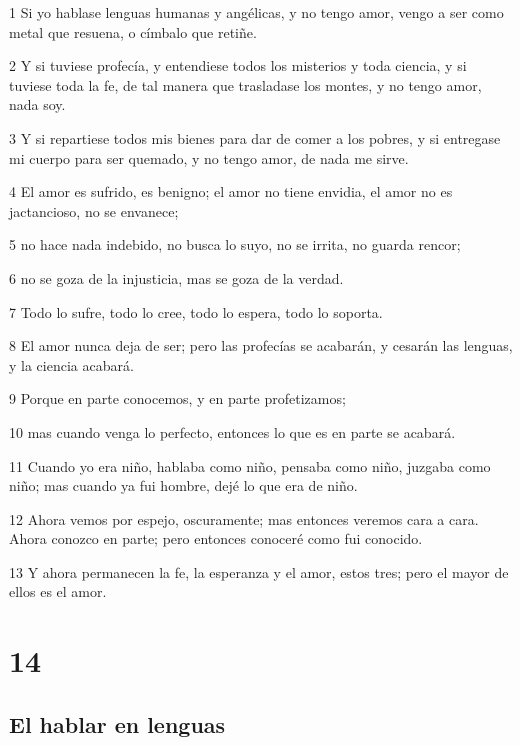 \par 1 Si yo hablase lenguas humanas y angélicas, y no tengo amor, vengo a ser como metal que resuena, o címbalo que retiñe.
\par 2 Y si tuviese profecía, y entendiese todos los misterios y toda ciencia, y si tuviese toda la fe, de tal manera que trasladase los montes, y no tengo amor, nada soy.
\par 3 Y si repartiese todos mis bienes para dar de comer a los pobres, y si entregase mi cuerpo para ser quemado, y no tengo amor, de nada me sirve.
\par 4 El amor es sufrido, es benigno; el amor no tiene envidia, el amor no es jactancioso, no se envanece;
\par 5 no hace nada indebido, no busca lo suyo, no se irrita, no guarda rencor;
\par 6 no se goza de la injusticia, mas se goza de la verdad.
\par 7 Todo lo sufre, todo lo cree, todo lo espera, todo lo soporta.
\par 8 El amor nunca deja de ser; pero las profecías se acabarán, y cesarán las lenguas, y la ciencia acabará.
\par 9 Porque en parte conocemos, y en parte profetizamos;
\par 10 mas cuando venga lo perfecto, entonces lo que es en parte se acabará.
\par 11 Cuando yo era niño, hablaba como niño, pensaba como niño, juzgaba como niño; mas cuando ya fui hombre, dejé lo que era de niño.
\par 12 Ahora vemos por espejo, oscuramente; mas entonces veremos cara a cara. Ahora conozco en parte; pero entonces conoceré como fui conocido.
\par 13 Y ahora permanecen la fe, la esperanza y el amor, estos tres; pero el mayor de ellos es el amor.

\chapter{14}

\section*{El hablar en lenguas}

